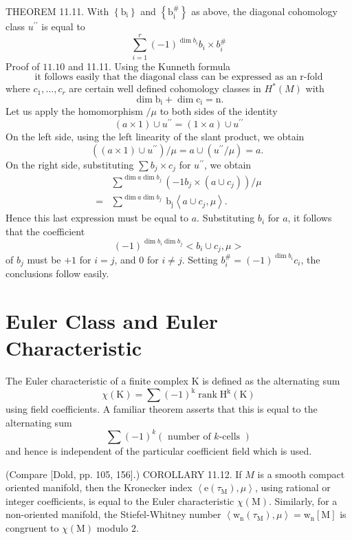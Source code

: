 \documentclass[10pt]{article}
\begin{document}
THEOREM 11.11. With $\left\{\mathrm{b}_{\mathrm{i}}\right\}$ and $\left\{\mathrm{b}_{\mathrm{i}}^{\#}\right\}$ as above, the diagonal cohomology class $u^{\prime \prime}$ is equal to
$$
\sum_{i=1}^{r}(-1)^{\operatorname{dim} b_{i}} b_{i} \times b_{i}^{\#}
$$
Proof of $11.10$ and 11.11. Using the Kunneth formula
$$
\text { it follows easily that the diagonal class can be expressed as an r-fold }
$$
where $c_{1}, \ldots, c_{r}$ are certain well defined cohomology classes in $H^{*}(M)$ with
$$
\operatorname{dim} \mathrm{b}_{\mathrm{i}}+\operatorname{dim} \mathrm{c}_{\mathrm{i}}=\mathrm{n} .
$$
Let us apply the homomorphism $/ \mu$ to both sides of the identity
$$
(a \times 1) \cup u^{\prime \prime}=(1 \times a) \cup u^{\prime \prime}
$$
On the left side, using the left linearity of the slant product, we obtain
$$
\left((a \times 1) \cup u^{\prime \prime}\right) / \mu=a \cup\left(u^{\prime \prime} / \mu\right)=a \text {. }
$$
On the right side, substituting $\sum b_{j} \times c_{j}$ for $u^{\prime \prime}$, we obtain
$$
\begin{aligned}
& \sum^{\operatorname{dim} a \operatorname{dim} b_{j}}\left(-1 b_{j} \times\left(a \cup c_{j}\right)\right) / \mu \\
=& \sum^{\operatorname{dim} a \operatorname{dim} b_{j}} \mathrm{~b}_{\mathrm{j}}\left\langle a \cup c_{j}, \mu\right\rangle .
\end{aligned}
$$
Hence this last expression must be equal to $a$. Substituting $b_{i}$ for $a$, it follows that the coefficient
$$
(-1)^{\operatorname{dim} b_{i} \operatorname{dim} b_{j}}<b_{i} \cup c_{j}, \mu>
$$
of $b_{j}$ must be $+1$ for $i=j$, and 0 for $i \neq j$. Setting $b_{i}^{\#}=(-1)^{\operatorname{dim} b_{i}} c_{i}$, the conclusions follow easily.

\section{Euler Class and Euler Characteristic}
The Euler characteristic of a finite complex $\mathrm{K}$ is defined as the alternating sum
$$
\chi(\mathrm{K})=\sum(-1)^{\mathrm{k}} \operatorname{rank} \mathrm{H}^{\mathrm{k}}(\mathrm{K})
$$
using field coefficients. A familiar theorem asserts that this is equal to the alternating sum
$$
\sum(-1)^{k}(\text { number of } k \text {-cells })
$$
and hence is independent of the particular coefficient field which is used.

(Compare [Dold, pp. 105, 156].) COROLLARY 11.12. If $M$ is a smooth compact oriented manifold, then the Kronecker index $\left\langle\mathrm{e}\left(\tau_{\mathrm{M}}\right), \mu\right\rangle$, using rational or integer coefficients, is equal to the Euler characteristic $\chi(\mathrm{M})$. Similarly, for a non-oriented manifold, the Stiefel-Whitney number $\left\langle\mathrm{w}_{\mathrm{n}}\left(\tau_{\mathrm{M}}\right), \mu\right\rangle=\mathrm{w}_{\mathrm{n}}[\mathrm{M}]$ is congruent to $\chi(\mathrm{M})$ modulo $2 .$
\end{document}
